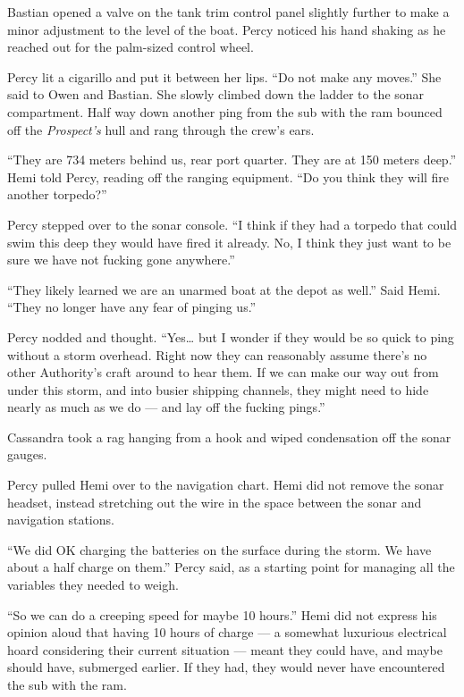 \documentclass[]{scrbook}
\begin{document}
Bastian opened a valve on the tank trim control panel slightly further
to make a minor adjustment to the level of the boat. Percy noticed his
hand shaking as he reached out for the palm-sized control wheel.

Percy lit a cigarillo and put it between her lips. ``Do not make any
moves.'' She said to Owen and Bastian. She slowly climbed down the
ladder to the sonar compartment. Half way down another ping from the sub
with the ram bounced off the \emph{Prospect's} hull and rang through the
crew's ears.

``They are 734 meters behind us, rear port quarter. They are at 150
meters deep.'' Hemi told Percy, reading off the ranging equipment. ``Do
you think they will fire another torpedo?''

Percy stepped over to the sonar console. ``I think if they had a torpedo
that could swim this deep they would have fired it already. No, I think
they just want to be sure we have not fucking gone anywhere.''

``They likely learned we are an unarmed boat at the depot as well.''
Said Hemi. ``They no longer have any fear of pinging us.''

Percy nodded and thought. ``Yes\ldots{} but I wonder if they would be so
quick to ping without a storm overhead. Right now they can reasonably
assume there's no other Authority's craft around to hear them. If we can
make our way out from under this storm, and into busier shipping
channels, they might need to hide nearly as much as we do --- and lay
off the fucking pings.''

Cassandra took a rag hanging from a hook and wiped condensation off the
sonar gauges.

Percy pulled Hemi over to the navigation chart. Hemi did not remove the
sonar headset, instead stretching out the wire in the space between the
sonar and navigation stations.

``We did OK charging the batteries on the surface during the storm. We
have about a half charge on them.'' Percy said, as a starting point for
managing all the variables they needed to weigh.

``So we can do a creeping speed for maybe 10 hours.'' Hemi did not
express his opinion aloud that having 10 hours of charge --- a somewhat
luxurious electrical hoard considering their current situation --- meant
they could have, and maybe should have, submerged earlier. If they had,
they would never have encountered the sub with the ram.
\end{document}
